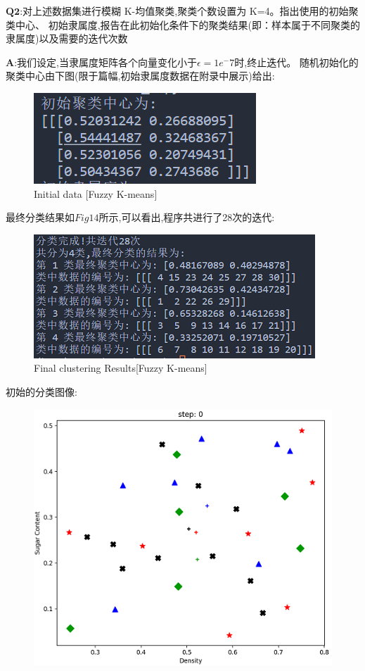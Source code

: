 \documentclass[homework]{IEEEtran}
\begin{document}
\begin{CJK}{UTF8}{gkai}
\clearpage
$\mathbf{Q2}$:对上述数据集进行模糊 K-均值聚类,聚类个数设置为 K=4。指出使用的初始聚类中心、
初始隶属度,报告在此初始化条件下的聚类结果(即：样本属于不同聚类的隶属度)以及需要的迭代次数 \par
$\mathbf{A}$:我们设定,当隶属度矩阵各个向量变化小于$\epsilon=1e^-7$时,终止迭代。
随机初始化的聚类中心由下图(限于篇幅,初始隶属度数据在附录中展示)给出: 
\begin{figure}[htb]
    \centerline{\includegraphics{Images/fig13.png}}
    \caption{Initial data [Fuzzy K-means]}
    \label{fig13}
    \end{figure} \par
最终分类结果如$Fig14$所示,可以看出,程序共进行了28次的迭代:
\begin{figure}[htb]
    \centerline{\includegraphics{Images/fig14.png}}
    \caption{Final clustering Results[Fuzzy K-means]}
    \label{fig14}
    \end{figure} \par
初始的分类图像:
\begin{figure}[htb]
    \centerline{\includegraphics{Images/fig15.png}}

\end{figure}
\end{CJK}
\end{document}
